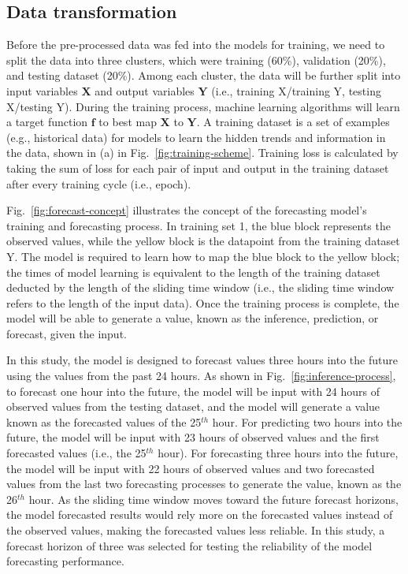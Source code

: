 \subsection{Data transformation}
Before the pre-processed data was fed into the models for training, we need to split the data into three clusters, which were training (60\%), validation (20\%), and testing dataset (20\%). Among each cluster, the data will be further split into input variables $\bm{X}$ and output variables $\bm{Y}$ (i.e., training X/training Y, testing X/testing Y). During the training process, machine learning algorithms will learn a target function $\bm{f}$ to best map $\bm{X}$ to $\bm{Y}$. A training dataset is a set of examples (e.g., historical data) for models to learn the hidden trends and information in the data, shown in (a) in Fig.~\ref{fig:training-scheme}. Training loss is calculated by taking the sum of loss for each pair of input and output in the training dataset after every training cycle (i.e., epoch).

Fig.~\ref{fig:forecast-concept} illustrates the concept of the forecasting model's training and forecasting process. 
In training set 1, the blue block represents the observed values, while the yellow block is the datapoint from the training dataset Y.
The model is required to learn how to map the blue block to the yellow block; the times of model learning is equivalent to the length of the training dataset deducted by the length of the sliding time window (i.e., the sliding time window refers to the length of the input data).
Once the training process is complete, the model will be able to generate a value, known as the inference, prediction, or forecast, given the input.

In this study, the model is designed to forecast values three hours into the future using   the values from the past 24 hours. 
As shown in Fig.~\ref{fig:inference-process}, to forecast one hour into the future, the model will be input with 24 hours of observed values from the testing dataset, and the model will generate a value known as the forecasted values of the 25$^{th}$ hour. For predicting two hours into the future, the model will be input with 23 hours of observed values and the first forecasted values (i.e., the 25$^{th}$ hour). For forecasting three hours into the future, the model will be input with 22 hours of observed values and two forecasted values from the last two forecasting processes to generate the value, known as the 26$^{th}$ hour. As the sliding time window moves toward the future forecast horizons, the model forecasted results would rely more on the forecasted values instead of the observed values, making the forecasted values less reliable. In this study, a forecast horizon of three was selected for testing the reliability of the model forecasting performance.

